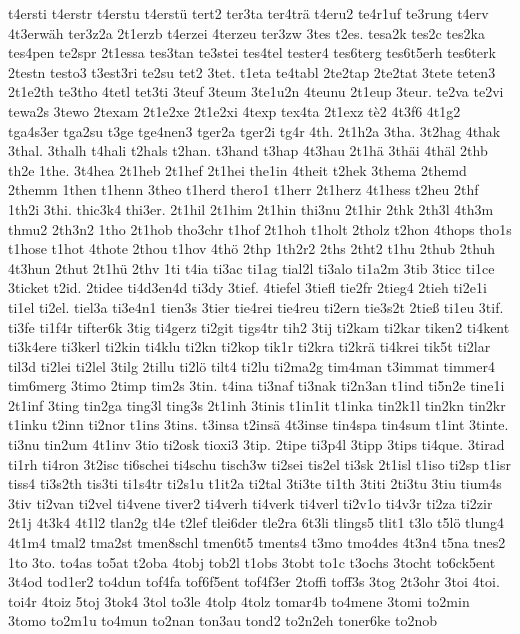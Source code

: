 {t4ersti
t4erstr
t4erstu
t4erstü
tert2
ter3ta
ter4trä
t4eru2
te4r1uf
te3rung
t4erv
4t3erwäh
ter3z2a
2t1erzb
t4erzei
4terzeu
ter3zw
3tes
t2es.
tesa2k
tes2c
tes2ka
tes4pen
te2spr
2t1essa
tes3tan
te3stei
tes4tel
tester4
tes6terg
tes6t5erh
tes6terk
2testn
testo3
t3est3ri
te2su
tet2
3tet.
t1eta
te4tabl
2te2tap
2te2tat
3tete
teten3
2t1e2th
te3tho
4tetl
tet3ti
3teuf
3teum
3te1u2n
4teunu
2t1eup
3teur.
te2va
te2vi
tewa2s
3tewo
2texam
2t1e2xe
2t1e2xi
4texp
tex4ta
2t1exz
tè2
4t3f6
4t1g2
tga4s3er
tga2su
t3ge
tge4nen3
tger2a
tger2i
tg4r
4th.
2t1h2a
3tha.
3t2hag
4thak
3thal.
3thalh
t4hali
t2hals
t2han.
t3hand
t3hap
4t3hau
2t1hä
3thäi
4thäl
2thb
th2e
1the.
3t4hea
2t1heb
2t1hef
2t1hei
the1in
4theit
t2hek
3thema
2themd
2themm
1then
t1henn
3theo
t1herd
thero1
t1herr
2t1herz
4t1hess
t2heu
2thf
1th2i
3thi.
thic3k4
thi3er.
2t1hil
2t1him
2t1hin
thi3nu
2t1hir
2thk
2th3l
4th3m
thmu2
2th3n2
1tho
2t1hob
tho3chr
t1hof
2t1hoh
t1holt
2tholz
t2hon
4thops
tho1s
t1hose
t1hot
4thote
2thou
t1hov
4thö
2thp
1th2r2
2ths
2tht2
t1hu
2thub
2thuh
4t3hun
2thut
2t1hü
2thv
1ti
t4ia
ti3ac
ti1ag
tial2l
ti3alo
ti1a2m
3tib
3ticc
ti1ce
3ticket
t2id.
2tidee
ti4d3en4d
ti3dy
3tief.
4tiefel
3tiefl
tie2fr
2tieg4
2tieh
ti2e1i
ti1el
ti2el.
tiel3a
ti3e4n1
tien3s
3tier
tie4rei
tie4reu
ti2ern
tie3s2t
2tieß
ti1eu
3tif.
ti3fe
ti1f4r
tifter6k
3tig
ti4gerz
ti2git
tigs4tr
tih2
3tij
ti2kam
ti2kar
tiken2
ti4kent
ti3k4ere
ti3kerl
ti2kin
ti4klu
ti2kn
ti2kop
tik1r
ti2kra
ti2krä
ti4krei
tik5t
ti2lar
til3d
ti2lei
ti2lel
3tilg
2tillu
ti2lö
tilt4
ti2lu
ti2ma2g
tim4man
t3immat
timmer4
tim6merg
3timo
2timp
tim2s
3tin.
t4ina
ti3naf
ti3nak
ti2n3an
t1ind
ti5n2e
tine1i
2t1inf
3ting
tin2ga
ting3l
ting3s
2t1inh
3tinis
t1in1it
t1inka
tin2k1l
tin2kn
tin2kr
t1inku
t2inn
ti2nor
t1ins
3tins.
t3insa
t2insä
4t3inse
tin4spa
tin4sum
t1int
3tinte.
ti3nu
tin2um
4t1inv
3tio
ti2osk
tioxi3
3tip.
2tipe
ti3p4l
3tipp
3tips
ti4que.
3tirad
ti1rh
ti4ron
3t2isc
ti6schei
ti4schu
tisch3w
ti2sei
tis2el
ti3sk
2t1isl
t1iso
ti2sp
t1isr
tiss4
ti3s2th
tis3ti
ti1s4tr
ti2s1u
t1it2a
ti2tal
3ti3te
ti1th
3titi
2ti3tu
3tiu
tium4s
3tiv
ti2van
ti2vel
ti4vene
tiver2
ti4verh
ti4verk
ti4verl
ti2v1o
ti4v3r
ti2za
ti2zir
2t1j
4t3k4
4t1l2
tlan2g
tl4e
t2lef
tlei6der
tle2ra
6t3li
tlings5
tlit1
t3lo
t5lö
tlung4
4t1m4
tmal2
tma2st
tmen8schl
tmen6t5
tments4
t3mo
tmo4des
4t3n4
t5na
tnes2
1to
3to.
to4as
to5at
t2oba
4tobj
tob2l
t1obs
3tobt
to1c
t3ochs
3tocht
to6ck5ent
3t4od
tod1er2
to4dun
tof4fa
tof6f5ent
tof4f3er
2toffi
toff3s
3tog
2t3ohr
3toi
4toi.
toi4r
4toiz
5toj
3tok4
3tol
to3le
4tolp
4tolz
tomar4b
to4mene
3tomi
to2min
3tomo
to2m1u
to4mun
to2nan
ton3au
tond2
to2n2eh
toner6ke
to2nob
}
